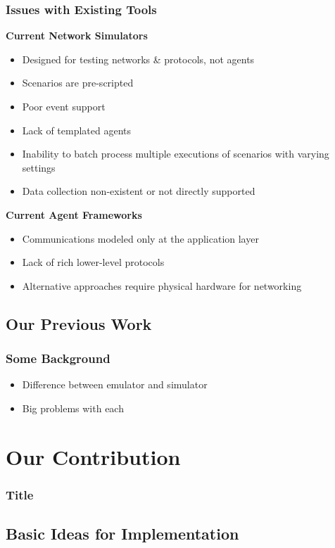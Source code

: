 \documentclass[mathserif]{beamer}
\begin{document}
\frame
{
    \frametitle{Issues with Existing Tools}
    \textbf{Current Network Simulators}
    \begin{itemize}
        \item Designed for testing networks \& protocols, not agents 
        \item Scenarios are pre-scripted
        \item Poor event support
        \item Lack of templated agents
        \item Inability to batch process multiple executions of scenarios with varying settings
        \item Data collection non-existent or not directly supported
    \end{itemize}
    \textbf{Current Agent Frameworks}
    \begin{itemize}
        \item Communications modeled only at the application layer
        \item Lack of rich lower-level protocols
        \item Alternative approaches require physical hardware for networking
    \end{itemize}
}

\subsection{Our Previous Work}
\frame
{
    \frametitle{Some Background}
    \begin{itemize}
        \item Difference between emulator and simulator
        \item Big problems with each
    \end{itemize}
}

\section{Our Contribution}

\frame
{
    \frametitle{Title}
}

\subsection{Basic Ideas for Implementation}
\end{document}

